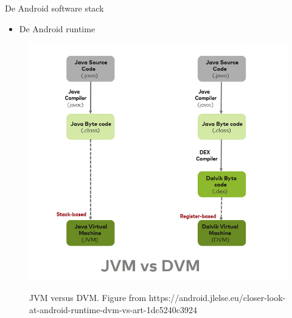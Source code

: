 \documentclass{beamer}
\begin{document}
\begin{frame}{De Android software stack }
\begin{itemize}	
	\item De Android runtime
\end{itemize}
\begin{figure}[ht]
	\centering
	\includegraphics[height=\textheight]{img/hello/jvmdvm.png}
	\label{fig:jvm versus dvm}
	\caption{JVM versus DVM. Figure from https://android.jlelse.eu/closer-look-at-android-runtime-dvm-vs-art-1dc5240c3924}
\end{figure}	
\end{frame}
\end{document}
